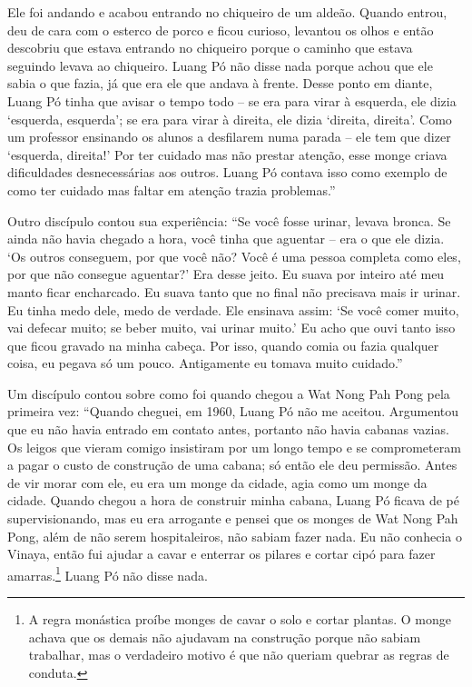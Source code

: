 Ele foi andando e acabou entrando no chiqueiro de um aldeão. Quando
entrou, deu de cara com o esterco de porco e ficou curioso, levantou os
olhos e então descobriu que estava entrando no chiqueiro porque o
caminho que estava seguindo levava ao chiqueiro. Luang Pó não disse nada
porque achou que ele sabia o que fazia, já que era ele que andava à
frente. Desse ponto em diante, Luang Pó tinha que avisar o tempo todo --
se era para virar à esquerda, ele dizia `esquerda, esquerda'; se era
para virar à direita, ele dizia `direita, direita'. Como um professor
ensinando os alunos a desfilarem numa parada -- ele tem que dizer
`esquerda, direita!' Por ter cuidado mas não prestar atenção, esse monge
criava dificuldades desnecessárias aos outros. Luang Pó contava isso
como exemplo de como ter cuidado mas faltar em atenção trazia
problemas.''

Outro discípulo contou sua experiência: ``Se você fosse urinar, levava
bronca. Se ainda não havia chegado a hora, você tinha que aguentar --
era o que ele dizia. `Os outros conseguem, por que você não? Você é uma
pessoa completa como eles, por que não consegue aguentar?' Era desse
jeito. Eu suava por inteiro até meu manto ficar encharcado. Eu suava
tanto que no final não precisava mais ir urinar. Eu tinha medo dele,
medo de verdade. Ele ensinava assim: `Se você comer muito, vai defecar
muito; se beber muito, vai urinar muito.' Eu acho que ouvi tanto isso
que ficou gravado na minha cabeça. Por isso, quando comia ou fazia
qualquer coisa, eu pegava só um pouco. Antigamente eu tomava muito
cuidado.''

Um discípulo contou sobre como foi quando chegou a Wat Nong Pah Pong
pela primeira vez: ``Quando cheguei, em 1960, Luang Pó não me aceitou.
Argumentou que eu não havia entrado em contato antes, portanto não havia
cabanas vazias. Os leigos que vieram comigo insistiram por um longo
tempo e se comprometeram a pagar o custo de construção de uma cabana; só
então ele deu permissão. Antes de vir morar com ele, eu era um monge da
cidade, agia como um monge da cidade. Quando chegou a hora de construir
minha cabana, Luang Pó ficava de pé supervisionando, mas eu era
arrogante e pensei que os monges de Wat Nong Pah Pong, além de não serem
hospitaleiros, não sabiam fazer nada. Eu não conhecia o Vinaya, então
fui ajudar a cavar e enterrar os pilares e cortar cipó para fazer
amarras.\footnote{A regra monástica proíbe monges de cavar o solo e
  cortar plantas. O monge achava que os demais não ajudavam na
  construção porque não sabiam trabalhar, mas o verdadeiro motivo é que
  não queriam quebrar as regras de conduta.} Luang Pó não disse nada.

